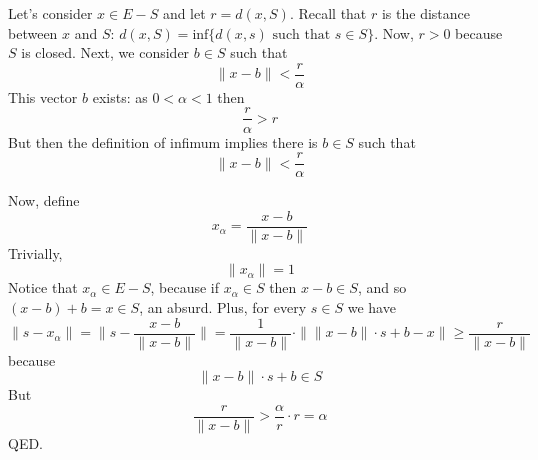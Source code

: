 \documentclass[12pt]{article}
\begin{document}
Let's consider $x \in E-S$ and let $r = d(x, S)$. Recall that $r$ is the distance between $x$ and $S$: $d(x,S) = \textrm{inf}\{d(x, s) \textrm{ such that } s \in S\}$. Now, $r > 0$ because $S$ is closed. Next, we consider $b \in S$ such that 
$$\|x - b\| < \frac{r}{\alpha}$$
This vector $b$ exists: as $0 < \alpha < 1$ then $$\frac{r}{\alpha} > r$$
But then the definition of infimum implies there is $b \in S$ such that $$\|x - b\| < \frac{r}{\alpha}$$

Now, define $$x_{\alpha} = \frac{x - b}{\|x - b\|}$$
Trivially, $$ \|x_{\alpha}\| = 1 $$
Notice that $x_{\alpha} \in E-S$, because if $x_{\alpha} \in S$ then $x - b \in S$, and so $(x - b) + b = x \in S$, an absurd.
Plus, for every $s \in S$ we have 
$$ \|s - x_{\alpha}\| = \|s - \frac{x - b}{\|x - b\|}\| = \frac{1}{\|x - b\|} \cdot \| \|x - b\| \cdot s + b - x \| \geq \frac{r}{\|x - b\|}$$ 
because $$\|x -b\| \cdot s + b \in S$$
But $$\frac{r}{\|x - b\|} > \frac{\alpha}{r} \cdot r = \alpha $$ QED.
\end{document}
